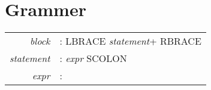 \chapter{Grammer}

\begin{tabular}{rl}
\textit{block}           & : LBRACE \textit{statement}+ RBRACE \\
\textit{statement}    & : \textit{expr} SCOLON \\

\textit{expr}            & : 
\end{tabular}